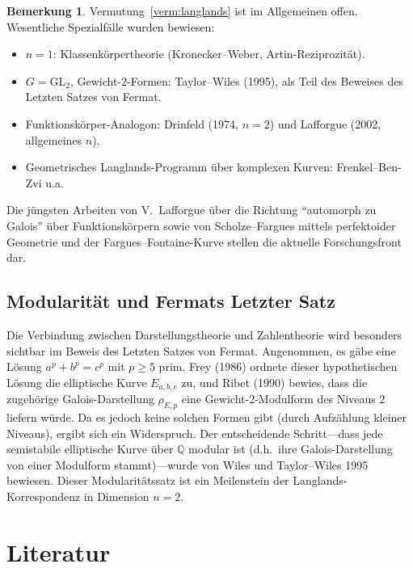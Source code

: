 \documentclass[12pt,a4paper]{amsart}
\theoremstyle{definition}
\newtheorem{bemerkung}[theorem]{Bemerkung}
\begin{document}
\begin{bemerkung}
Vermutung~\ref{verm:langlands} ist im Allgemeinen offen.  Wesentliche
Spezialfälle wurden bewiesen:
\begin{itemize}
  \item $n = 1$: Klassenkörpertheorie (Kronecker--Weber, Artin-Reziprozität).
  \item $G = \mathrm{GL}_2$, Gewicht-$2$-Formen: Taylor--Wiles (1995), als Teil
        des Beweises des Letzten Satzes von Fermat.
  \item Funktionskörper-Analogon: Drinfeld (1974, $n=2$) und Lafforgue
        (2002, allgemeines $n$).
  \item Geometrisches Langlands-Programm über komplexen Kurven: Frenkel--Ben-Zvi
        u.a.
\end{itemize}
Die jüngsten Arbeiten von V.\ Lafforgue über die Richtung ``automorph zu Galois''
über Funktionskörpern sowie von Scholze--Fargues mittels perfektoider Geometrie
und der Fargues--Fontaine-Kurve stellen die aktuelle Forschungsfront dar.
\end{bemerkung}

\subsection{Modularität und Fermats Letzter Satz}

Die Verbindung zwischen Darstellungstheorie und Zahlentheorie wird besonders
sichtbar im Beweis des Letzten Satzes von Fermat.  Angenommen, es gäbe eine
Lösung $a^p + b^p = c^p$ mit $p \geq 5$ prim.  Frey (1986) ordnete dieser
hypothetischen Lösung die elliptische Kurve $E_{a,b,c}$ zu, und Ribet (1990)
bewies, dass die zugehörige Galois-Darstellung $\rho_{E,p}$ eine
Gewicht-$2$-Modulform des Niveaus $2$ liefern würde.  Da es jedoch keine solchen
Formen gibt (durch Aufzählung kleiner Niveaus), ergibt sich ein Widerspruch.
Der entscheidende Schritt---dass jede semistabile elliptische Kurve über
$\mathbb{Q}$ modular ist (d.h.\ ihre Galois-Darstellung von einer Modulform
stammt)---wurde von Wiles und Taylor--Wiles 1995 bewiesen.  Dieser
Modularitätssatz ist ein Meilenstein der Langlands-Korrespondenz in Dimension
$n = 2$.

\section*{Literatur}
\end{document}
